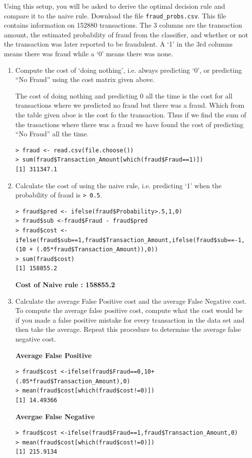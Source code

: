 \documentclass[fontsize=10pt]{scrartcl}
\begin{document}
		Using this setup, you will be asked to derive the optimal decision rule and compare it to the naive rule. Download the file \texttt{fraud\_probs.csv}. This file contains information on 152880 transactions. The 3 columns are the transaction amount, the estimated probability of fraud from the classifier, and whether or not the transaction was later reported to be fraudulent. A `1' in the 3rd columns means there was fraud while a `0' means there was none.

		\begin{enumerate}
			\item
			Compute the cost of `doing nothing', i.e. always predicting `0', or predicting ``No Fraud'' using the cost matrix given above.

			The cost of doing nothing and predicting 0 all the time is the cost for all transactions where we predicted no fraud but there was a fraud. Which from the table given aboe is the cost fo the transaction. Thus if we find the sum of the trasactions where there was a fraud we have found the cost of predicting ``No Fraud'' all the time.

\begin{verbatim}
> fraud <- read.csv(file.choose())
> sum(fraud$Transaction_Amount[which(fraud$Fraud==1)])
[1] 311347.1
\end{verbatim}
			
			\item
			Calculate the cost of using the naive rule, i.e. predicting `1' when the probability of fraud is \texttt{> 0.5}.

\begin{verbatim}
> fraud$pred <- ifelse(fraud$Probability>.5,1,0)
> fraud$sub <-fraud$Fraud - fraud$pred
> fraud$cost <- ifelse(fraud$sub==1,fraud$Transaction_Amount,ifelse(fraud$sub==-1,(10 + (.05*fraud$Transaction_Amount)),0))
> sum(fraud$cost)
[1] 158855.2
\end{verbatim}
			\textbf{Cost of Naive rule : 158855.2}

			\item
			Calculate the average False Positive cost and the average False Negative cost. To compute the average false positive cost, compute what the cost would be if you made a false positive mistake for every transaction in the data set and then take the average. Repeat this procedure to determine the average false negative cost.

			\textbf{Average False Positive}
\begin{verbatim}
> fraud$cost <-ifelse(fraud$Fraud==0,10+(.05*fraud$Transaction_Amount),0)
> mean(fraud$cost[which(fraud$cost!=0)])
[1] 14.49366
\end{verbatim}

			\textbf{Avergae False Negative}
\begin{verbatim}
> fraud$cost <-ifelse(fraud$Fraud==1,fraud$Transaction_Amount,0)
> mean(fraud$cost[which(fraud$cost!=0)])
[1] 215.9134
\end{verbatim}
		\end{enumerate}
		
\end{document}
